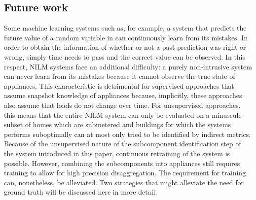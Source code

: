 \subsection{Future work}

Some machine learning systems such as, for example, a system that predicts the future value of a random variable in can continuously learn from its mistakes. In order to obtain the information of whether or not a past prediction was right or wrong, simply time needs to pass and the correct value can be observed. In this respect, NILM systems face an additional difficulty: a purely non-intrusive system can never learn from its mistakes because it cannot observe the true state of appliances. This characteristic is detrimental for supervised approaches that assume snapshot knowledge of appliances because, implicitly, these approaches also assume that loads do not change over time. For unsupervised approaches, this means that the entire NILM system can only be evaluated on a minuscule subset of homes which are submetered and buildings for which the systems performs suboptimally can at most only tried to be identified by indirect metrics. Because of the unsupervised nature of the subcomponent identification step of the system introduced in this paper, continuous retraining of the system is possible. However, combining the subcomponents into appliances still requires training to allow for high precision disaggregation. The requirement for training can, nonetheless, be alleviated. Two strategies that might alleviate the need for ground truth will be discussed here in more detail.

